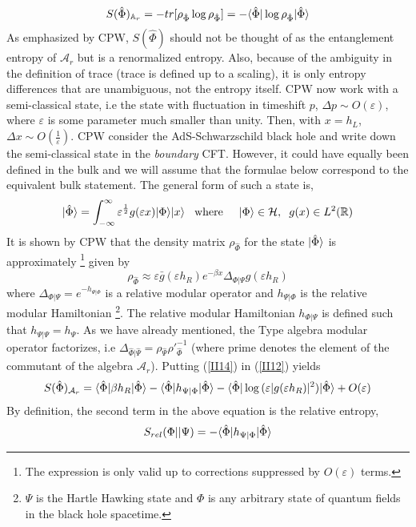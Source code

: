 \documentclass[12pt]{article}
\DeclarePairedDelimiter\bra{\langle}{\rvert}
\DeclarePairedDelimiter\ket{\lvert}{\rangle}
\newcommand{\RomanNumeralCaps}[1]
    {\MakeUppercase{\romannumeral #1}}
\begin{document}
  \begin{equation}\label{II12}
  S(\hat{\Phi})_{\mathbb{A}_r}= -tr[\rho_{\hat{\Phi}} \log{\rho_{\hat{\Phi}}}]= -\bra {\hat{\Phi}} \log {\rho_{\hat{\Phi}}} \ket{\hat{\Phi}}
\end{equation}
As emphasized by CPW,  $S(\hat{\Phi})$ should not be thought of as the entanglement entropy of $\mathcal{A}_r$ but is a renormalized entropy. Also, because of the ambiguity in the definition of trace (trace is defined up to a scaling), it is only entropy differences that are unambiguous, not the entropy itself. CPW now work with a semi-classical state, i.e the state with fluctuation in timeshift $p$, $\Delta p \sim O(\varepsilon)$, where $\varepsilon$ is some parameter much smaller than unity. Then, with $x=h_{L}$, $\Delta x \sim O(\frac{1}{\varepsilon})$. CPW consider the AdS-Schwarzschild black hole and write down the semi-classical state in the \emph{boundary} CFT.
However, it could have equally been defined in the bulk and we will assume that the formulae below correspond to the equivalent bulk statement.
The general form of such a state is,
\begin{equation}\label{II13}
\ket{\hat{\Phi}}= \int_{-\infty}^{\infty} \varepsilon^{\frac{1}{2}} g(\varepsilon x )\ket{\Phi}\ket{x} \hspace{3mm} \textrm{where} \hspace{5mm} \ket{\Phi} \in \mathcal{H},\hspace{2mm} g(x)\in L^2(\mathbb{R})
\end{equation}
It is shown by CPW that the density matrix $\rho_{\hat{\Phi}}$ for the state $\ket{\hat{\Phi}}$ is approximately \footnote{The expression is only valid up to corrections suppressed by $O(\varepsilon)$ terms.} given by
\begin{equation}\label{II14}
\rho_{\hat{\Phi}} \approx \varepsilon \bar{g}(\varepsilon h_{R})e^{-\beta x}\Delta_{\Phi|\Psi}g(\varepsilon h_{R})
\end{equation}
 where $\Delta_{\Phi|\Psi}= e^{-h_{\Psi|\Phi}}$ is a relative modular operator and $h_{\Psi|\Phi}$ is the relative modular Hamiltonian \footnote{$\Psi$ is the Hartle Hawking state and $\Phi$ is any arbitrary state of quantum fields in the black hole spacetime.}. The relative modular Hamiltonian $h_{\Phi|\Psi}$  is defined such that  $h_{\Psi|\Psi}= h_{\Psi}$. As we have already mentioned, the Type  \RomanNumeralCaps {2} algebra modular operator factorizes, i.e $\Delta_{\hat{\Phi}|\hat{\Psi}}= \rho_{\hat{\Psi}} \rho'^{-1}_{\hat{\Phi}}$ (where prime denotes the element of the commutant of the algebra $\mathcal{A}_{r}$)\cite{VRGE}. Putting (\ref{II14}) in (\ref{II12}) yields
 \begin{equation}\label{II15}
 S(\hat{\Phi})_{\mathcal{A}_{r}}=\bra{\hat{\Phi}}\beta h_{R}\ket{\hat{\Phi}}-\bra{\hat{\Phi}}h_{\Psi|\Phi}\ket{\hat{\Phi}}-\bra{\hat{\Phi}} \log{(\varepsilon |g(\varepsilon h_R)|^2)}\ket{\hat{\Phi}} + O(\varepsilon)
 \end{equation}
By definition, the second term in the above equation is the relative entropy,
\begin{equation}\label{II16}
S_{rel}(\Phi||\Psi)= -\bra{\hat{\Phi}}h_{\Psi|\Phi}\ket{\hat{\Phi}}
\end{equation}
\end{document}
